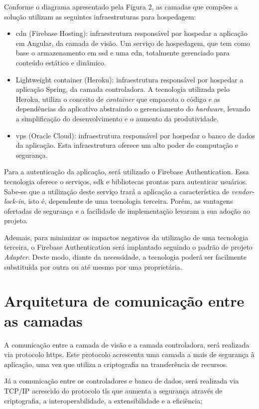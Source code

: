 Conforme o diagrama apresentado pela Figura 2, as camadas que compões a solução utilizam as seguintes infraestruturas para hospedagem:
\begin{itemize}
\item \ac{cdn} (Firebase Hosting): infraestrutura responsável por hospedar a aplicação em Angular, da camada de visão. Um serviço de hospedagem, que tem como base o armazenamento em \ac{ssd} e uma \ac{cdn}, totalmente gerenciado para conteúdo estático e dinâmico.
\item  Lightweight container (Heroku): infraestrutura responsável por hospedar a aplicação Spring, da camada controladora. A tecnologia utilizada pelo Heroku, utiliza o conceito de \textit{\gls{container}} que empacota o código e as dependências do aplicativo abstraindo o gerenciamento do \textit{\gls{hardware}}, levando a simplificação do desenvolvimento e o aumento da produtividade.
\item \ac{vps} (Oracle Cloud): infraestrutura responsável por hospedar o banco de dados da aplicação. Esta infraestrutura oferece um alto poder de computação e segurança.
\end{itemize}
Para a autenticação da aplicação, será utilizado o Firebase Authentication. Essa tecnologia oferece o serviços, \ac{sdk} e bibliotecas prontas para autenticar usuários. Sabe-se que a utilização deste serviço trará a aplicação a característica de \textit{\gls{vendor-lock-in}}, isto é, dependente de uma tecnologia terceira.  Porém, as vantagens ofertadas de segurança e a facilidade de implementação levaram a sua adoção ao projeto. 

Ademais, para minimizar os impactos negativos da utilização de uma tecnologia terceira, o Firebase Authentication será implantado seguindo o padrão de projeto \textit{Adapter}. Deste modo, diante da necessidade, a tecnologia poderá ser facilmente substituída por outra ou até mesmo por uma proprietária.


\section{Arquitetura de comunicação entre as camadas}
A comunicação entre a camada de visão e a camada controladora, será realizada via protocolo \ac{https}. Este protocolo acrescenta uma camada a mais de segurança à aplicação, uma vez que utiliza a criptografia na transferência de recursos.


Já a comunicação entre os controladores e banco de dados, será realizada via TCP/IP acrescido do protocolo \ac{tls} que aumenta a segurança através de criptografia, a interoperabilidade, a extensibilidade e a eficiência;


